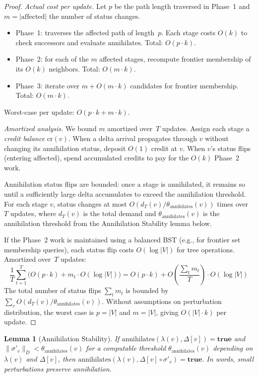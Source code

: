 \documentclass[11pt,a4paper]{article}
\newtheorem{lemma}[theorem]{Lemma}
\theoremstyle{definition}
\newcommand{\ann}{\mathrm{annihilates}}
\begin{document}
\begin{proof}
\emph{Actual cost per update.}  Let $p$ be the path length traversed in
Phase~1 and $m = |\mathrm{affected}|$ the number of status changes.
\begin{itemize}[nosep]
  \item Phase~1: traverses the affected path of length~$p$.  Each stage
    costs $O(k)$ to check successors and evaluate $\ann$.
    Total: $O(p \cdot k)$.
  \item Phase~2: for each of the $m$ affected stages, recompute frontier
    membership of its $O(k)$ neighbors.  Total: $O(m \cdot k)$.
  \item Phase~3: iterate over $m + O(m \cdot k)$ candidates for frontier
    membership.  Total: $O(m \cdot k)$.
\end{itemize}
Worst-case per update: $O(p \cdot k + m \cdot k)$.

\emph{Amortized analysis.}  We bound $m$ amortized over~$T$ updates.
Assign each stage a \emph{credit balance} $\mathrm{cr}(v)$.  When a delta
arrival propagates through $v$ without changing its annihilation status,
deposit $O(1)$ credit at $v$.  When $v$'s status flips (entering
$\mathrm{affected}$), spend accumulated credits to pay for the $O(k)$
Phase~2 work.

Annihilation status flips are bounded: once a stage is annihilated, it
remains so until a sufficiently large delta accumulates to exceed the
annihilation threshold.  For each stage $v$, status changes at most
$O(d_T(v) / \theta_{\ann}(v))$ times over $T$ updates, where $d_T(v)$ is
the total demand and $\theta_{\ann}(v)$ is the annihilation threshold from
the Annihilation Stability lemma below.

If the Phase~2 work is maintained using a balanced BST (e.g., for frontier
set membership queries), each status flip costs $O(\log |V|)$ for tree
operations.  Amortized over~$T$ updates:
\[
  \frac{1}{T}\sum_{t=1}^T \bigl(O(p \cdot k) + m_t \cdot O(\log |V|)\bigr)
  = O(p \cdot k) + O\!\left(\frac{\sum_t m_t}{T}\right) \cdot O(\log |V|)
\]
The total number of status flips $\sum_t m_t$ is bounded by
$\sum_v O(d_T(v)/\theta_{\ann}(v))$.  Without assumptions on perturbation
distribution, the worst case is $p = |V|$ and $m = |V|$, giving
$O(|V| \cdot k)$ per update.
\end{proof}

\begin{lemma}[Annihilation Stability]\label{lem:ann-stability}
If $\ann(\lambda(v), \Delta[v]) = \mathbf{true}$ and
$\|\sigma'_v\|_D < \theta_{\ann}(v)$ for a computable threshold
$\theta_{\ann}(v)$ depending on $\lambda(v)$ and $\Delta[v]$,
then $\ann(\lambda(v), \Delta[v] \circ \sigma'_v) = \mathbf{true}$.
In words, small perturbations preserve annihilation.
\end{lemma}
\end{document}
